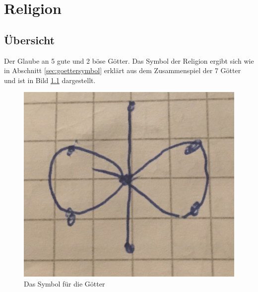 \chapter{Religion}
\section{Übersicht}
\begin{outline}
	\1 Der Glaube an 5 gute und 2 böse Götter.
	\1 Das Symbol der Religion ergibt sich wie in Abschnitt \ref{sec:goettersymbol} erklärt aus dem Zusammenspiel der 7 Götter und ist in Bild \ref{fig:goettersymbol} dargestellt.
\end{outline}

\begin{figure}[tbh]
	\centering
	\includegraphics[width=0.3\textheight]{Abbildungen/Gesellschaft/Goettersymbol}
	\caption[Göttersymbol]{Das Symbol für die Götter}
	\label{fig:goettersymbol}
\end{figure}

